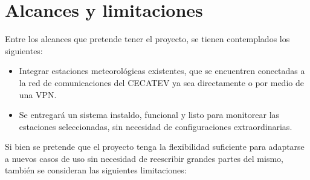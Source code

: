 


\section{Alcances y limitaciones}



Entre los alcances que pretende tener el proyecto, se tienen contemplados los siguientes:

\begin{itemize}

   \item Integrar estaciones meteorológicas existentes, que se encuentren conectadas a la red de comunicaciones del CECATEV ya sea directamente o por medio de una VPN.
   \item Se entregará un sistema instaldo, funcional y listo para monitorear las estaciones seleccionadas, sin necesidad de configuraciones extraordinarias.

\end{itemize}

Si bien se pretende que el proyecto tenga la flexibilidad suficiente para adaptarse a nuevos casos de uso sin necesidad de reescribir grandes partes del mismo, también se consideran las siguientes limitaciones:

